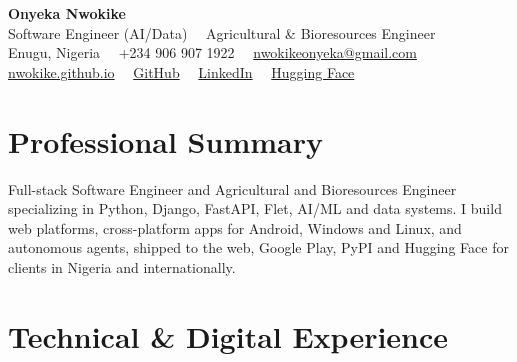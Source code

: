 \documentclass[10pt,letterpaper]{article}
\newcommand{\sep}{\ \textperiodcentered\ }
\begin{document}
\begin{center}
{\LARGE\bfseries Onyeka Nwokike}\\[2pt]
{\large Software Engineer (AI/Data) \sep Agricultural \& Bioresources Engineer}\\[4pt]
{\small Enugu, Nigeria \sep +234 906 907 1922 \sep \href{mailto:nwokikeonyeka@gmail.com}{nwokikeonyeka@gmail.com}}\\[2pt]
{\small \href{https://nwokike.github.io}{nwokike.github.io} \sep \href{https://github.com/Nwokike}{GitHub} \sep \href{https://www.linkedin.com/in/onyeka-nwokike}{LinkedIn} \sep \href{https://huggingface.co/nwokikeonyeka}{Hugging Face}}
\end{center}

\section*{Professional Summary}
Full-stack Software Engineer and Agricultural and Bioresources Engineer specializing in Python, Django, FastAPI, Flet, AI/ML and data systems. I build web platforms, cross-platform apps for Android, Windows and Linux, and autonomous agents, shipped to the web, Google Play, PyPI and Hugging Face for clients in Nigeria and internationally.

\section*{Technical \& Digital Experience}
\end{document}
